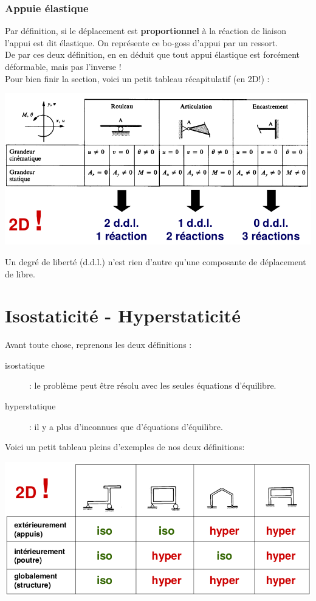 		\subsubsection{Appuie élastique}
		Par définition, si le déplacement est \textbf{proportionnel} à la 
		réaction de liaison l'appui est dit élastique. On représente ce 
		bo-goss d’appui par un ressort.\\
				
		De par ces deux définition, en en déduit que tout appui élastique 
		est forcément déformable, mais pas l'inverse ! \\
		Pour bien finir la section, voici un petit tableau récapitulatif 
		(en 2D!) :
		\begin{center}
		\includegraphics[scale=0.45]{ch2/image1}
		\end{center}
		Un degré de liberté (d.d.l.) n'est rien d'autre qu'une composante 
		de déplacement de libre.
		
\section{Isostaticité - Hyperstaticité}
Avant toute chose, reprenons les deux définitions :
\begin{description}
\item[isostatique]: le problème peut être résolu avec les seules équations 
d'équilibre.
\item[hyperstatique]: il y a plus d'inconnues que d'équations d'équilibre.
\end{description}
Voici un petit tableau pleins d'exemples de nos deux définitions:
\begin{center}
\includegraphics[scale=0.45]{ch2/image2}
\end{center}


